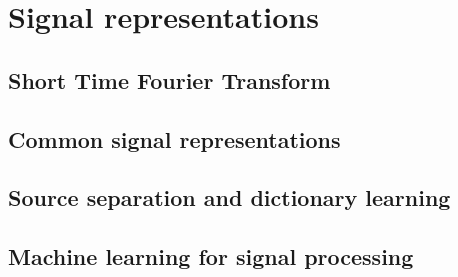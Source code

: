 \documentclass[a4paper, 10pt, dvipsnames]{book}
\begin{document}
\chapter{Signal representations}
\label{chap:sig_representations}

\section{Short Time Fourier Transform}
\label{sec:stft}

\section{Common signal representations}
\label{sec:comon_signal_rep}

\section{Source separation and dictionary learning}
\label{sec:dl}


\section{Machine learning for signal processing}
\label{sec:mlsp}


\ForceHTMLPage





\ForceHTMLPage
\printindex
{}
\end{document}
